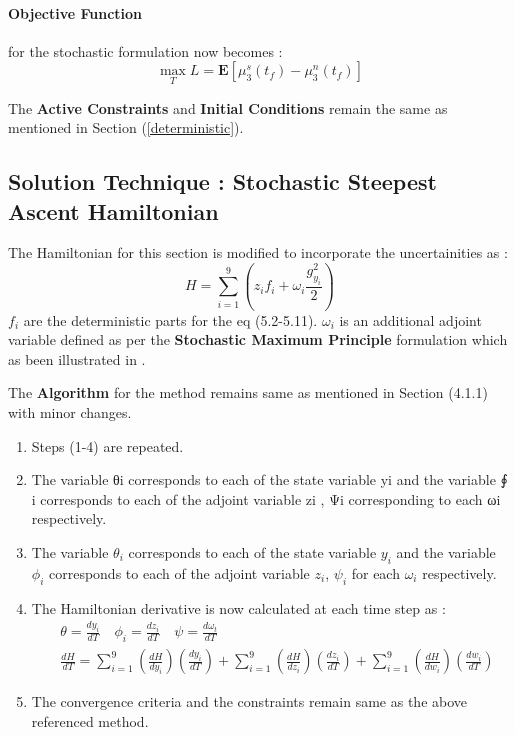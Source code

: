 \paragraph{Objective Function} for the stochastic formulation now becomes :
\begin{equation} \label{objective}
\max_{T} L = \mathbf{E}\left[ \mu_{3}^{s}(t_{f}) - \mu_{3}^{n}(t_{f})\right]
\end{equation}

The \textbf{Active Constraints} and \textbf{Initial Conditions} remain the same as mentioned in Section (\ref{deterministic}).

\subsection{Solution Technique : Stochastic Steepest Ascent Hamiltonian}

The Hamiltonian for this section is modified to incorporate the uncertainities as\cite{yenkie} :
\begin{equation}
H = \sum_{i=1}^{9} \left( z_{i}f_{i} + \omega_{i}\frac{g_{y_{i}}^2}{2} \right)
\end{equation}
$f_{i}$ are the deterministic parts for the eq (5.2-5.11). $\omega_{i}$ is an additional adjoint variable defined as per the \textbf{Stochastic Maximum Principle} formulation which as been illustrated in \cite{ramirez}.  

The \textbf{Algorithm} for the method remains same as mentioned in Section (4.1.1) with minor changes.
\begin{enumerate}
\item  Steps (1-4) are repeated. 
\item The variable θi corresponds to each of the state variable yi and the variable ∮ i corresponds to each of the adjoint variable zi , Ψi corresponding to each ωi respectively.
\item The variable $\theta_{i}$ corresponds to each of the state variable $y_{i}$ and the variable $\phi_{i}$ corresponds to each of the adjoint variable $z_{i}$, $\psi_{i}$ for each $\omega_{i}$ respectively.

\item The Hamiltonian derivative is now calculated at each time step  as :
\begin{align}
&\theta = \frac{dy_{i}}{dT} \quad \phi_{i} = \frac{dz_{i}}{dT} \quad \psi = \frac{d\omega_{t}}{dT} \\
&\frac{dH}{dT} = \sum_{i=1}^{9} \left( \frac{dH}{dy_{i}}\right)\left(	\frac{dy_{i}}{dT} \right) + \sum_{i=1}^{9} \left(\frac{dH}{dz_{i}}\right)\left(\frac{dz_{i}}{dT} \right) + \sum_{i=1}^{9} \left(\frac{dH}{dw_{i}}\right)\left(\frac{dw_{i}}{dT} \right)
\end{align}
\item The convergence criteria and the constraints remain same as the above referenced method.
\end{enumerate} 


